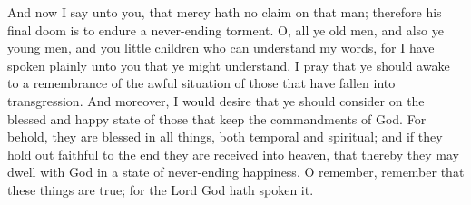 And now I say unto you, that mercy hath no claim on that man; therefore his final doom is to endure a never-ending torment.
\bverse \iffalse O, all ye old men, and also ye young men, and you little children who can understand my words, for I have spoken plainly unto you that ye might understand, I pray that ye should awake to a remembrance of the awful situation of those that have fallen into transgression. \fi
O, all ye old men, and also ye young men, and you little children who can understand my words, for I have spoken plainly unto you that ye might understand, I pray that ye should awake to a remembrance of the awful situation of those that have fallen into transgression.
\bverse \iffalse And moreover, I would desire that ye should consider on the blessed and happy state of those that keep the commandments of God. For behold, they are blessed in all things, both temporal and spiritual; and if they hold out faithful to the end they are received into heaven, that thereby they may dwell with God in a state of never-ending happiness. O remember, remember that these things are true; for the Lord God hath spoken it. \fi
And moreover, I would desire that ye should consider on the blessed and happy state of those that keep the commandments of God. For behold, they are blessed in all things, both temporal and spiritual; and if they hold out faithful to the end they are received into heaven, that thereby they may dwell with God in a state of never-ending happiness. O remember, remember that these things are true; for the Lord God hath spoken it.

